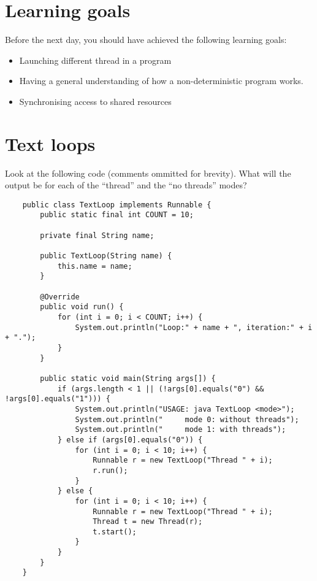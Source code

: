\documentclass{article}
\begin{document}
\section*{Learning goals}
\label{sec:learning-goals}

Before the next day, you should have achieved the following learning
goals: 

\begin{itemize}
\item Launching different thread in a program
\item Having a general understanding of how a non-deterministic program
  works. 
\item Synchronising access to shared resources
\end{itemize}

\section{Text loops}
\label{sec:text-loops}

Look at the following code (comments ommitted for brevity). What will
the output be for each of the ``thread'' and the ``no threads'' modes? 

\begin{verbatim}
    public class TextLoop implements Runnable {
        public static final int COUNT = 10;

        private final String name;

        public TextLoop(String name) {
            this.name = name;
        }

        @Override
        public void run() {
            for (int i = 0; i < COUNT; i++) {
                System.out.println("Loop:" + name + ", iteration:" + i + ".");
            }
        }

        public static void main(String args[]) {
            if (args.length < 1 || (!args[0].equals("0") && !args[0].equals("1"))) {
                System.out.println("USAGE: java TextLoop <mode>");
                System.out.println("     mode 0: without threads");
                System.out.println("     mode 1: with threads");
            } else if (args[0].equals("0")) {
                for (int i = 0; i < 10; i++) {
                    Runnable r = new TextLoop("Thread " + i);
                    r.run();
                }
            } else {
                for (int i = 0; i < 10; i++) {
                    Runnable r = new TextLoop("Thread " + i);
                    Thread t = new Thread(r);
                    t.start();
                }
            }
        }
    }
\end{verbatim}
\end{document}
